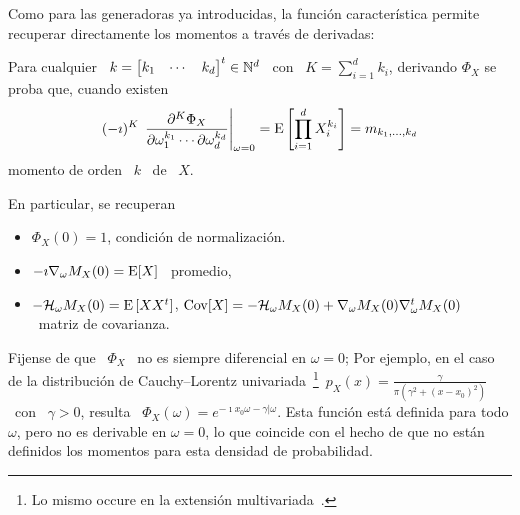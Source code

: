 Como para las generadoras ya introducidas, la funci\'on caracter\'istica permite
recuperar directamente los momentos a trav\'es de derivadas:
%
\begin{lema}
\label{Lem:MP:GeneracionMomentoViaCaracteristica}
%
  Para cualquier \  $k = \begin{bmatrix} k_1 & \cdots  & k_d \end{bmatrix}^t \in
  \mathbb{N}^d$ \  con \  $K =  \sum_{i=1}^d k_i$, derivando  $\Phi_X$ se  proba que,
  cuando existen
  \[
  (-   \imath)^K  \,   \left.\frac{\partial^K   \Phi_X}{\partial  \omega_1^{k_1}
      \cdots    \partial    \omega_d^{k_d}}\right|_{\omega=0}    =    \operatorname{E}\left[
    \prod_{i=1}^d X_i^{k_i} \right] = m_{k_1,\ldots,k_d}
  \]
  momento de orden \ $k$ \ de \ $X$.
\end{lema}
%
En particular, se recuperan
%
\begin{itemize}
\item $\Phi_X(0) = 1$, condici\'on de normalizaci\'on.
%
\item $- \imath \nabla_\omega M_X(0) = \operatorname{E}[X]$ \ promedio,
%
\item  $- \mathcal{H}_\omega  M_X(0) =  \operatorname{E}\left[ X  X^t \right]$,  \ie $\operatorname{Cov}[X]  = -
  \mathcal{H}_\omega M_X(0) + \nabla_\omega M_X(0) \nabla_\omega^t M_X(0)$ \ matriz de
  covarianza.
\end{itemize}

Fijense de  que \  $\Phi_X$ \  no es siempre  diferencial en  $\omega =  0$; Por
ejemplo,    en   el    caso    de   la    distribuci\'on   de    Cauchy--Lorentz
univariada~\footnote{Lo      mismo       occure      en      la      extensi\'on
  multivariada~\cite{SamTaq91}.}\ $p_X(x) =  \frac{\gamma}{\pi \left( \gamma^2 +
    (x-x_0)^2  \right)}$ \  con  \ $\gamma  >  0$, resulta  \ $\Phi_X(\omega)  =
e^{-\imath x_0  \omega -\gamma |\omega}  $. Esta funci\'on est\'a  definida para
todo $\omega$,  pero no es  derivable en  $\omega = 0$,  lo que coincide  con el
hecho  de  que  no  est\'an   definidos  los  momentos  para  esta  densidad  de
probabilidad.

